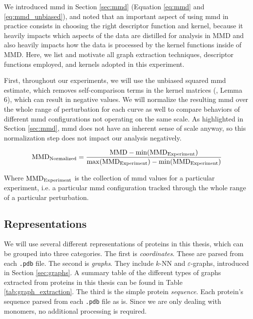 We introduced \acrshort{mmd} in Section \ref{sec:mmd} (Equation \ref{eq:mmd} and
\ref{eq:mmd_unbiased}), and noted that an important aspect of using
\acrshort{mmd} in practice consists in choosing the right descriptor function
and kernel, because it heavily impacts which aspects of the data are distilled
for analysis in MMD and also heavily impacts how the data is processed by the
kernel functions inside of MMD. Here, we list and motivate all graph extraction
techniques, descriptor functions employed, and kernels adopted in this
experiment.

First, throughout our experiments, we will use the unbiased squared
\acrshort{mmd} estimate, which removes self-comparison terms in the kernel
matrices (\cite{gretton2012kernel}, Lemma 6), which can result in negative
values. We will normalize the resulting \acrshort{mmd} over the whole range of
perturbation for each curve as well to compare behaviors of different
\acrshort{mmd} configurations not operating on the same scale. As highlighted in
Section \ref{sec:mmd}, \acrshort{mmd} does not have an inherent sense of scale
anyway, so this normalization step does not impact our analysis negatively.

\begin{equation}
  \label{eq:normalization}
  \text{MMD}_{\textnormal{Normalized}} = {\text{MMD} - \min(\text{MMD}_{\textnormal{Experiment}}) \over \max(\text{MMD}_{\textnormal{Experiment}}) - \min(\text{MMD}_{\textnormal{Experiment}})}
\end{equation}

Where $\text{MMD}_{\textnormal{Experiment}}$ is the collection of \acrshort{mmd} values for a particular
experiment, i.e. a particular \acrshort{mmd} configuration tracked through the whole range
of a particular perturbation.

\subsection{Representations}
We will use several different representations of proteins in this thesis, which can be
grouped into three categories. The first is \emph{coordinates}. These are parsed
from each \texttt{.pdb} file. The second is \emph{graphs}. They include $k$-NN
and $\varepsilon$-graphs, introduced in Section \ref{sec:graphs}. A summary
table of the different types of graphs extracted from proteins in this thesis
can be found in Table \ref{tab:graph_extraction}. The third is the simple
protein \emph{sequence}. Each protein's sequence parsed from each \texttt{.pdb}
file as is. Since we are only dealing with monomers, no additional processing is
required.


